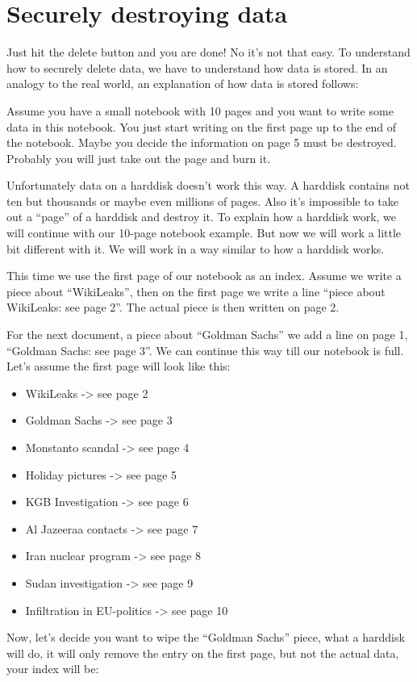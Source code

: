 \section{Securely destroying data}

Just hit the delete button and you are done! No it's not that easy. To
understand how to securely delete data, we have to understand how data
is stored. In an analogy to the real world, an explanation of how data
is stored follows:

Assume you have a small notebook with 10 pages and you want to write
some data in this notebook. You just start writing on the first page up
to the end of the notebook. Maybe you decide the information on page 5
must be destroyed. Probably you will just take out the page and burn it.

Unfortunately data on a harddisk doesn't work this way. A harddisk
contains not ten but thousands or maybe even millions of pages. Also
it's impossible to take out a ``page'' of a harddisk and destroy it. To
explain how a harddisk work, we will continue with our 10-page notebook
example. But now we will work a little bit different with it. We will
work in a way similar to how a harddisk works.

This time we use the first page of our notebook as an index. Assume we
write a piece about ``WikiLeaks'', then on the first page we write a
line ``piece about WikiLeaks: see page 2''. The actual piece is then
written on page 2.

For the next document, a piece about ``Goldman Sachs'' we add a line on
page 1, ``Goldman Sachs: see page 3''. We can continue this way till our
notebook is full. Let's assume the first page will look like this:

\begin{itemize}
\item
  WikiLeaks -\textgreater{} see page 2
\item
  Goldman Sachs -\textgreater{} see page 3
\item
  Monstanto scandal -\textgreater{} see page 4
\item
  Holiday pictures -\textgreater{} see page 5
\item
  KGB Investigation -\textgreater{} see page 6
\item
  Al Jazeeraa contacts -\textgreater{} see page 7
\item
  Iran nuclear program -\textgreater{} see page 8
\item
  Sudan investigation -\textgreater{} see page 9
\item
  Infiltration in EU-politics -\textgreater{} see page 10
\end{itemize}
Now, let's decide you want to wipe the ``Goldman Sachs'' piece, what a
harddisk will do, it will only remove the entry on the first page, but
not the actual data, your index will be:

